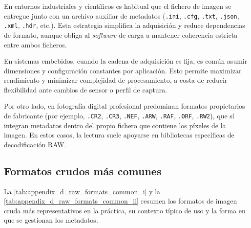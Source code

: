En entornos industriales y científicos es habitual que el fichero de imagen se
entregue junto con un archivo auxiliar de metadatos (\texttt{.ini}, \texttt{.cfg},
\texttt{.txt}, \texttt{.json}, \texttt{.xml}, \texttt{.hdr}, etc.). Esta
estrategia simplifica la adquisición y reduce dependencias de formato, aunque
obliga al \textit{software} de carga a mantener coherencia estricta entre ambos
ficheros.

En sistemas embebidos, cuando la cadena de adquisición es fija, es común
asumir dimensiones y configuración constantes por aplicación. Esto permite
maximizar rendimiento y minimizar complejidad de procesamiento, a costa de reducir
flexibilidad ante cambios de sensor o perfil de captura.

Por otro lado, en fotografía digital profesional predominan formatos propietarios
de fabricante (por ejemplo, \texttt{.CR2}, \texttt{.CR3}, \texttt{.NEF},
\texttt{.ARW}, \texttt{.RAF}, \texttt{.ORF}, \texttt{.RW2}), que sí integran
metadatos dentro del propio fichero que contiene los píxeles de la imagen. 
En estos casos, la lectura suele apoyarse en bibliotecas específicas de decodificación RAW.

\newpage

\subsection{Formatos crudos más comunes}

La \autoref{tab:appendix_d_raw_formats_common_i} y la
\autoref{tab:appendix_d_raw_formats_common_ii} resumen los formatos de imagen
cruda más representativos en la práctica, su contexto típico de uso y la forma en
que se gestionan los metadatos.

